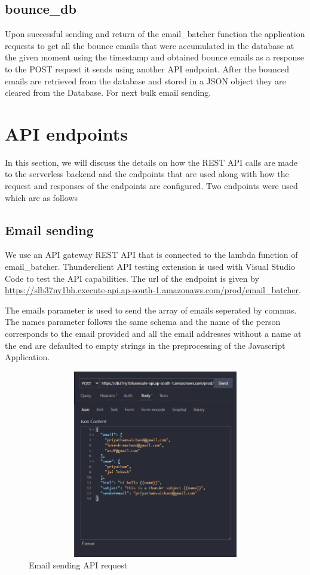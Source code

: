 \subsection{bounce\_db}

Upon successful sending and return of the email\_batcher function the application requests to get all the bounce emails that were accumulated in the database at the given moment using the timestamp and obtained bounce emails as a response to the POST request it sends using another API endpoint. After the bounced emails are retrieved from the database and stored in a JSON object they are cleared from the Database. For next bulk email sending.  


\section{API endpoints}
\label{api_endpoint}

In this section, we will discuss the details on how the REST API calls are made to the serverless backend and the endpoints that are used along with how the request and responses of the endpoints are configured. Two endpoints were used which are as follows 


\subsection{Email sending}
We use an API gateway REST API that is connected to the lambda function of email\_batcher. Thunderclient API testing extension is used with Visual Studio Code to test the API capabilities.
The url of the endpoint is given by 
\url{https://slb37ny1bh.execute-api.ap-south-1.amazonaws.com/prod/email\_batcher}.\par
The emails parameter is used to send the array of emails seperated by commas. The names parameter follows the same schema and the name of the person corresponds to the email provided and all the email addresses without a name at the end are defaulted to empty strings in the preprocessing of the Javascript Application.

\begin{figure}[H]
            \centering
            \includegraphics[width=150mm,height=82mm]{figures/api_1.png}
            \caption{Email sending API request}
            \label{fig:email-api}
\end{figure}



